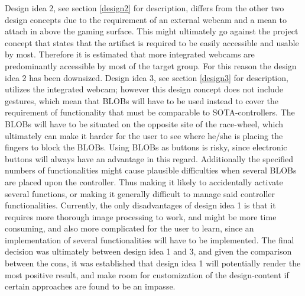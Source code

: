 Design idea 2, see section \ref{design2} for description, differs from the other two design concepts due to the requirement of an external webcam and a mean to attach in above the gaming surface. This might ultimately go against the project concept that states that the artifact is required to be easily accessible and usable by most. Therefore it is estimated that more integrated webcams are predominantly accessible by most of the target group. For this reason the design idea 2 has been downsized. Design idea 3, see section \ref{design3} for description, utilizes the integrated webcam; however this design concept does not include gestures, which mean that BLOBs will have to be used instead to cover the requirement of functionality that must be comparable to SOTA-controllers. The BLOBs will have to be situated on the opposite site of the race-wheel, which ultimately can make it harder for the user to see where he/she is placing the fingers to block the BLOBs. Using BLOBs as buttons is risky, since electronic buttons will always have an advantage in this regard. Additionally the specified numbers of functionalities might cause plausible difficulties when several BLOBs are placed upon the controller. Thus making it likely to accidentally activate several functions, or making it generally difficult to manage said controller functionalities. Currently, the only disadvantages of design idea 1 is that it requires more thorough image processing to work, and might be more time consuming, and also more complicated for the user to learn, since an implementation of several functionalities will have to be implemented. The final decision was ultimately between design idea 1 and 3, and given the comparison between the cons, it was established that design idea 1 will potentially render the most positive result, and make room for customization of the design-content if certain approaches are found to be an impasse. 
